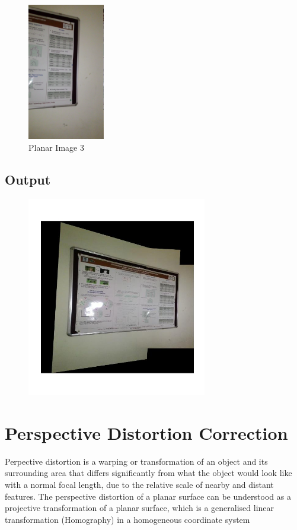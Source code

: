 \documentclass[12pt]{article}
\begin{document}
\begin{figure}[htp]
\centering
\includegraphics[width=0.3\textwidth]{planar3.jpg}\hfill
\caption{Planar Image 3}
\label{fig:Image 3}
\end{figure}

\vspace{20em}
\subsection{Output}

\begin{figure}[htp]
\centering
\includegraphics[width=0.7\textwidth]{planarstitch.jpg}\hfill
\end{figure}

\clearpage
\section{ Perspective Distortion Correction}
Perpective distortion is a warping or transformation of an object and its surrounding area that differs significantly from what the object would look like with a normal focal length, due to the relative scale of nearby and distant features. The perspective distortion of a planar surface can be understood as a projective transformation of a planar surface, which is a generalised linear transformation (Homography) in a homogeneous coordinate system
\end{document}
